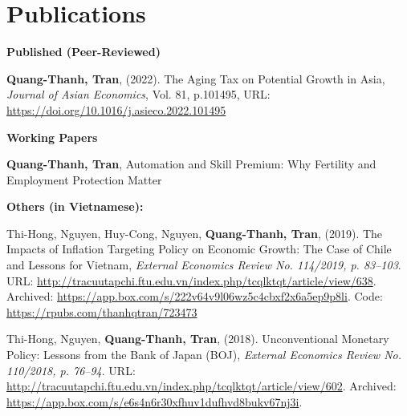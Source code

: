 \section{\sc Publications}
{\bf Published (Peer-Reviewed)}
\vspace*{.05in}
\begin{etaremune}[]
\item
  {\bf Quang-Thanh, Tran},
  (2022).
  {The Aging Tax on Potential Growth in Asia},
  {\it Journal of Asian Economics}, Vol. 81, p.101495,
  {URL: \url{https://doi.org/10.1016/j.asieco.2022.101495}}
\end{etaremune}

\vspace{4mm}

{\bf Working Papers}
\vspace*{.05in}
\begin{etaremune}[]
\item
  {\bf Quang-Thanh, Tran},
  {Automation and Skill Premium: Why Fertility and Employment Protection Matter}
\end{etaremune}

\vspace{4mm}


{\bf Others (in Vietnamese):}
\vspace*{.05in}
\begin{etaremune}[]
	\item
	Thi-Hong, Nguyen,
	Huy-Cong, Nguyen,
	{\bf Quang-Thanh, Tran},
	(2019).
	{The Impacts of Inflation Targeting Policy on Economic Growth: The Case of Chile and Lessons for Vietnam},
	{\it External Economics Review No. 114/2019, p. 83--103}.
	{URL: \url{http://tracuutapchi.ftu.edu.vn/index.php/tcqlktqt/article/view/638}}.
	{Archived: \url{https://app.box.com/s/222v64v9l06wz5c4cbxf2x6a5ep9p8li}. Code: \url{https://rpubs.com/thanhqtran/723473}}

	\item 
	Thi-Hong, Nguyen,
	{\bf Quang-Thanh, Tran},
	(2018).
	Unconventional Monetary Policy: Lessons from the Bank of Japan (BOJ),
	{\it External Economics Review No. 110/2018, p. 76--94}.
	{URL: \url{http://tracuutapchi.ftu.edu.vn/index.php/tcqlktqt/article/view/602}}. 
	{Archived: \url{https://app.box.com/s/e6s4n6r30xfhuv1dufhvd8bukv67nj3i}}.
\end{etaremune}


